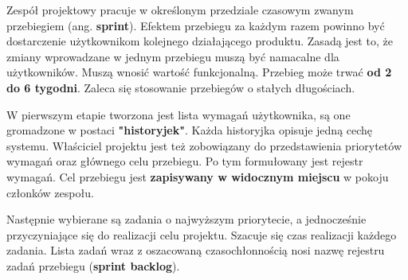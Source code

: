 \begin{itemize}
	Zespół projektowy pracuje w określonym przedziale czasowym zwanym przebiegiem (ang. \textbf{sprint}). Efektem przebiegu za każdym razem powinno być dostarczenie użytkownikom kolejnego działającego produktu. Zasadą jest to, że zmiany wprowadzane w jednym przebiegu muszą być namacalne dla użytkowników. Muszą wnosić wartość funkcjonalną. Przebieg może trwać \textbf{od 2 do 6 tygodni}. Zaleca się stosowanie przebiegów o stałych długościach.
	
	W pierwszym etapie tworzona jest lista wymagań użytkownika, są one gromadzone w postaci \textbf{"historyjek"}. Każda historyjka opisuje jedną cechę systemu. Właściciel projektu jest też zobowiązany do przedstawienia priorytetów wymagań oraz głównego celu przebiegu. Po tym formułowany jest rejestr wymagań. Cel przebiegu jest \textbf{zapisywany w widocznym miejscu} w pokoju członków zespołu.
	
	Następnie wybierane są zadania o najwyższym priorytecie, a jednocześnie przyczyniające się do realizacji celu projektu. Szacuje się czas realizacji każdego zadania. Lista zadań wraz z oszacowaną czasochłonnością nosi nazwę rejestru zadań przebiegu (\textbf{sprint backlog}).
\end{itemize}